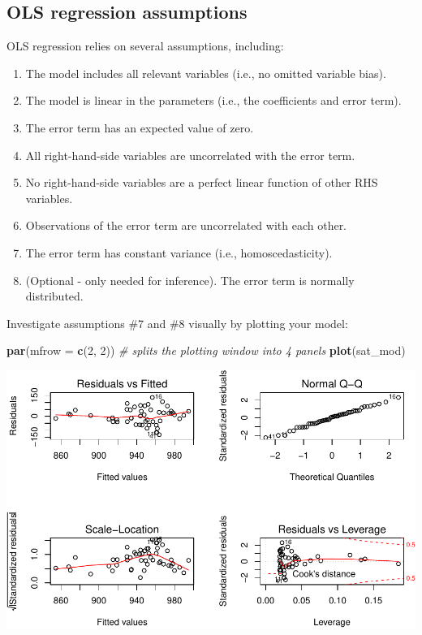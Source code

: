 \documentclass[
]{book}
\newenvironment{Shaded}{\begin{snugshade}}{\end{snugshade}}
\newcommand{\CommentTok}[1]{\textcolor[rgb]{0.56,0.35,0.01}{\textit{#1}}}
\newcommand{\DataTypeTok}[1]{\textcolor[rgb]{0.13,0.29,0.53}{#1}}
\newcommand{\DecValTok}[1]{\textcolor[rgb]{0.00,0.00,0.81}{#1}}
\newcommand{\KeywordTok}[1]{\textcolor[rgb]{0.13,0.29,0.53}{\textbf{#1}}}
\newcommand{\NormalTok}[1]{#1}
\providecommand{\tightlist}{%
  \setlength{\itemsep}{0pt}\setlength{\parskip}{0pt}}
\begin{document}
\hypertarget{ols-regression-assumptions}{%
\subsection{OLS regression assumptions}\label{ols-regression-assumptions}}

OLS regression relies on several assumptions, including:

\begin{enumerate}
\def\labelenumi{\arabic{enumi}.}
\tightlist
\item
  The model includes all relevant variables (i.e., no omitted variable bias).
\item
  The model is linear in the parameters (i.e., the coefficients and error term).
\item
  The error term has an expected value of zero.
\item
  All right-hand-side variables are uncorrelated with the error term.
\item
  No right-hand-side variables are a perfect linear function of other RHS variables.
\item
  Observations of the error term are uncorrelated with each other.
\item
  The error term has constant variance (i.e., homoscedasticity).
\item
  (Optional - only needed for inference). The error term is normally distributed.
\end{enumerate}

Investigate assumptions \#7 and \#8 visually by plotting your model:

\begin{Shaded}
\begin{Highlighting}[]
  \KeywordTok{par}\NormalTok{(}\DataTypeTok{mfrow =} \KeywordTok{c}\NormalTok{(}\DecValTok{2}\NormalTok{, }\DecValTok{2}\NormalTok{)) }\CommentTok{\# splits the plotting window into 4 panels}
  \KeywordTok{plot}\NormalTok{(sat\_mod)}
\end{Highlighting}
\end{Shaded}

\includegraphics{R/Rmodels/figures/unnamed-chunk-91-1.pdf}
\end{document}
